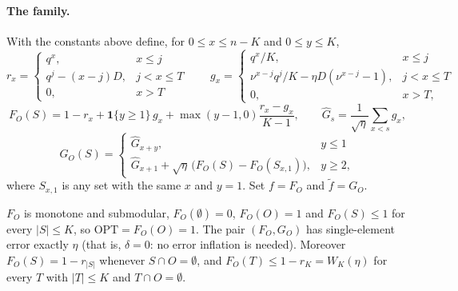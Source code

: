 \paragraph{The family.}
With the constants above define, for $0\le x\le n-K$ and $0\le y\le K$,
\[
  r_x=\begin{cases}q^{x}, & x\le j\\ q^{j}-(x-j)D, & j<x\le T\\ 0,& x>T\end{cases}
  \qquad
  g_x=\begin{cases}q^{x}/K, & x\le j\\
      \nu^{x-j}q^{j}/K-\eta D(\nu^{x-j}-1), & j<x\le T\\ 0,& x>T,\end{cases}
\]
\[
  F_O(S)=1-r_x+\mathbf 1\{y\ge1\}\,g_x+\max(y-1,0)\frac{r_x-g_x}{K-1},
  \qquad
  \hat G_s=\frac1{\sqrt\eta}\sum_{x<s}g_x,
\]
\[
  G_O(S)=\begin{cases}\hat G_{x+y}, & y\le 1\\[2pt]
    \hat G_{x+1}+\sqrt\eta\,\bigl(F_O(S)-F_O(S_{x,1})\bigr), & y\ge2,\end{cases}
\]
where $S_{x,1}$ is any set with the same $x$ and $y=1$.  Set $f=F_O$ and
$\tilde f=G_O$.

\begin{lemma}\label{lem:f3-family}
$F_O$ is monotone and submodular, $F_O(\emptyset)=0$, $F_O(O)=1$ and
$F_O(S)\le1$ for every $|S|\le K$, so $\mathrm{OPT}=F_O(O)=1$.  The pair
$(F_O,G_O)$ has single-element error exactly $\eta$ (that is, $\delta=0$: no
error inflation is needed).  Moreover $F_O(S)=1-r_{|S|}$ whenever
$S\cap O=\emptyset$, and $F_O(T)\le 1-r_K=W_K(\eta)$ for every $T$ with
$|T|\le K$ and $T\cap O=\emptyset$.
\end{lemma}


